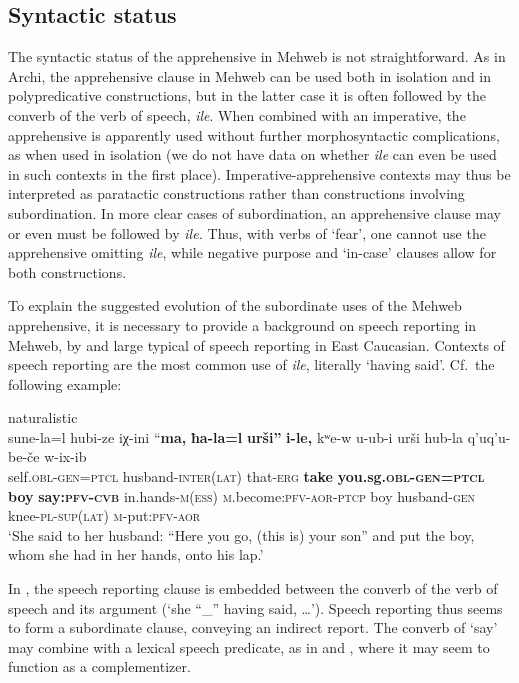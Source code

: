 \documentclass[output=paper,colorlinks,citecolor=brown]{langscibook}
\begin{document}
\subsection{Syntactic status}
\label{Msyntactic}
 
The syntactic status of the apprehensive in Mehweb is not straightforward. As in Archi, the apprehensive clause in Mehweb can be used both in isolation and in polypredicative constructions, but in the latter case it is often followed by the converb of the verb of speech, \textit{ile}. When combined with an imperative, the apprehensive is apparently used without further morphosyntactic complications, as when used in isolation (we do not have data on whether \textit{ile} can even be used in such contexts in the first place). Imperative-apprehensive contexts may thus be interpreted as paratactic constructions rather than constructions involving subordination. In more clear cases of subordination, an apprehensive clause may or even must be followed by \textit{ile.} Thus, with verbs of `fear', one cannot use the apprehensive omitting \textit{ile}, while negative purpose and `in-case' clauses allow for both constructions. 

To explain the suggested evolution of the subordinate uses of the Mehweb apprehensive, it is necessary to provide a background on speech reporting in Mehweb, by and large typical of speech reporting in East Caucasian. Contexts of speech reporting are the most common use of \textit{ile}, literally `having said'. Cf.\ the following example: 
 
\ea \label{ex:DD50} \textnormal{naturalistic}\\
\gll sune-la=l hubi-ze iχ-ini ``\textbf{ma,} \textbf{ħa-la=l} \textbf{urši''} \textbf{i-le,} kʷe-w u-ub-i urši hub-la q'uq'u-be-če w-ix-ib\\
self.\textsc{obl-gen=ptcl} husband-\textsc{inter(lat)} that-\textsc{erg} \textbf{take} \textbf{you.sg.\textsc{obl-gen=ptcl}} \textbf{boy} \textbf{say:\textsc{pfv-cvb}} in.hands-\textsc{m(ess)}	\textsc{m}.become:\textsc{pfv-aor-ptcp} boy husband-\textsc{gen} knee-\textsc{pl-sup(lat)} \textsc{m}-put:\textsc{pfv-aor}\\
\glt `She said to her husband: ``Here you go, (this is) your son'' and put the boy, whom she had in her hands, onto his lap.'
\z

\noindent In , the speech reporting clause is embedded between the converb of the verb of speech and its argument (`she ``\_'' having said, \ldots'). Speech reporting thus seems to form a subordinate clause, conveying an indirect report. The converb of `say' may combine with a lexical speech predicate, as in  and , where it may seem to function as a complementizer.
\end{document}
